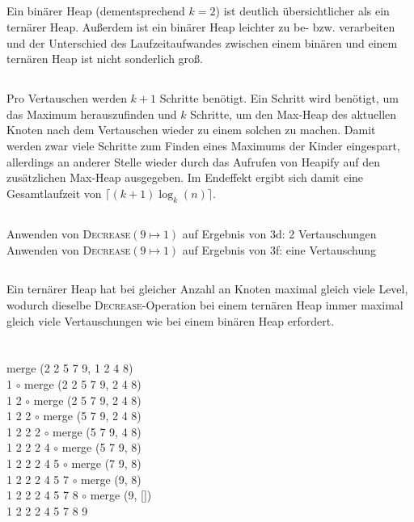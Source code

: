\documentclass[10pt,a4paper,oneside,ngerman,numbers=noenddot]{scrartcl}
\begin{document}
	\subsection{} %
		Ein binärer Heap (dementsprechend $k=2$) ist deutlich übersichtlicher als ein ternärer Heap. Außerdem ist ein binärer Heap leichter zu be- bzw. verarbeiten und der Unterschied des Laufzeitaufwandes zwischen einem binären und einem ternären Heap ist nicht sonderlich groß.
	\subsection{} %
		Pro Vertauschen werden $k+1$ Schritte benötigt. Ein Schritt wird benötigt, um das Maximum herauszufinden und $k$ Schritte, um den Max-Heap des aktuellen Knoten nach dem Vertauschen wieder zu einem solchen zu machen. Damit werden zwar viele Schritte zum Finden eines Maximums der Kinder eingespart, allerdings an anderer Stelle wieder durch das Aufrufen von Heapify auf den zusätzlichen Max-Heap ausgegeben. Im Endeffekt ergibt sich damit eine Gesamtlaufzeit von $\lceil (k+1)\log_{k}(n) \rceil$.
	\subsection{} %
		Anwenden von \textsc{Decrease}$(9 \mapsto 1)$ auf Ergebnis von 3d: 2 Vertauschungen \\
		Anwenden von \textsc{Decrease}$(9 \mapsto 1)$ auf Ergebnis von 3f: eine Vertauschung
	\subsection{} %
		Ein ternärer Heap hat bei gleicher Anzahl an Knoten maximal gleich viele Level, wodurch dieselbe \textsc{Decrease}-Operation bei einem ternären Heap immer maximal gleich viele Vertauschungen wie bei einem binären Heap erfordert.
		
\section{} %
	\subsection{} %
		merge (2 2 5 7 9, 1 2 4 8)  \\
		1 $\circ$ merge (2 2 5 7 9, 2 4 8) \\
		1 2 $\circ$ merge (2 5 7 9, 2 4 8) \\
		1 2 2 $\circ$ merge (5 7 9, 2 4 8) \\
		1 2 2 2 $\circ$ merge (5 7 9, 4 8) \\
		1 2 2 2 4 $\circ$ merge (5 7 9, 8) \\
		1 2 2 2 4 5 $\circ$ merge (7 9, 8) \\
		1 2 2 2 4 5 7 $\circ$ merge (9, 8) \\
		1 2 2 2 4 5 7 8 $\circ$ merge (9, []) \\
		1 2 2 2 4 5 7 8 9
\end{document}
